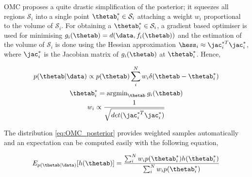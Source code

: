 OMC proposes a quite drastic simplification of the posterior; it
squeezes all regions $\mathcal{S}_i$ into a single point
$\thetab_i^* \in \mathcal{S}_i$ attaching a weight $w_i$ proportional
to the volume of $\mathcal{S}_i$. For obtaining a
$\thetab_i^* \in \mathcal{S}_i$, a gradient based optimiser is used
for minimising $g_i(\thetab) = d(\data, f_i(\thetab))$ and the
estimation of the volume of $\mathcal{S}_i$ is done using the Hessian
approximation $\hess_i \approx \jac_i^{*T}\jac_i^*$, where $\jac_i^*$
is the Jacobian matrix of $g_i(\thetab)$ at $\thetab_i^*$. Hence,

\begin{gather} \label{eq:OMC_posterior}
    p(\thetab|\data) \propto p(\thetab) \sum_i^N w_i \delta(\thetab - \thetab_i^*)\\
  \thetab_i^* = \text{argmin}_{\thetab} \:g_i(\thetab) \\
  w_i \propto \frac{1}{\sqrt{det( \jac_i^{*T}\jac_i^*)}}
\end{gather}

The distribution \eqref{eq:OMC_posterior} provides weighted samples
automatically and an expectation can be computed easily with the
following equation,

\begin{equation}
  \label{eq:OMC_expectation}
  E_{p(\thetab|\data)}[h(\thetab)] = \frac{\sum_i^N w_i p(\thetab_i^*)h(\thetab_i^*)}{\sum_i^N w_i p(\thetab_i^*)}
\end{equation}
